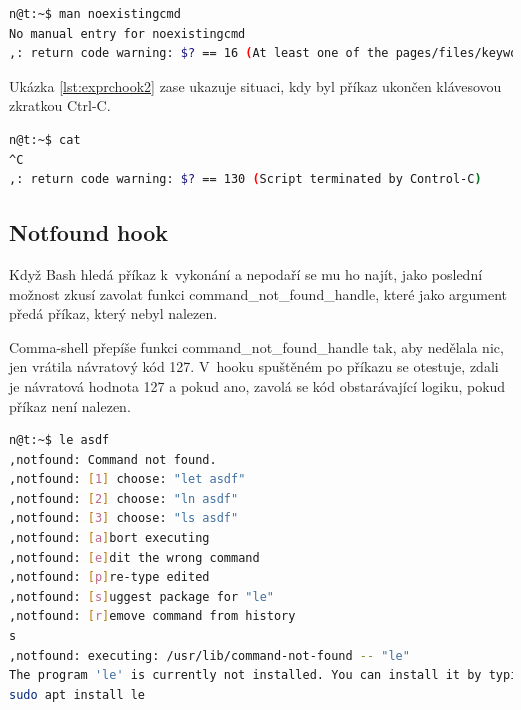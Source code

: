 \documentclass[thesis=M,czech]{FITthesis}[2012/06/26]
\begin{document}
\noindent
\begin{minipage}{\linewidth}
\begin{lstlisting}[language=bash, caption={Explain RC hook}, label={lst:exprchook}]
n@t:~$ man noexistingcmd
No manual entry for noexistingcmd
,: return code warning: $? == 16 (At least one of the pages/files/keywords didn't exist or wasn't matched.)
\end{lstlisting}
\end{minipage}

Ukázka \ref{lst:exprchook2} zase ukazuje situaci, kdy byl příkaz ukončen klávesovou zkratkou Ctrl-C.

\noindent
\begin{minipage}{\linewidth}
\begin{lstlisting}[language=bash, caption={Explain RC hook}, label={lst:exprchook2}]
n@t:~$ cat
^C
,: return code warning: $? == 130 (Script terminated by Control-C)
\end{lstlisting}
\end{minipage}


\subsection{Notfound hook}

Když Bash hledá příkaz k~vykonání a nepodaří se mu ho najít, jako poslední možnost zkusí zavolat funkci command\_not\_found\_handle, které jako argument předá příkaz, který nebyl nalezen.

Comma-shell přepíše funkci command\_not\_found\_handle tak, aby nedělala nic, jen vrátila návratový kód 127. V~hooku spuštěném po příkazu se otestuje, zdali je návratová hodnota 127 a pokud ano, zavolá se kód obstarávající logiku, pokud příkaz není nalezen.

\noindent
\begin{minipage}{\linewidth}
\begin{lstlisting}[language=bash, caption={Explain RC hook}, label={lst:notfoundhook}]
n@t:~$ le asdf
,notfound: Command not found.
,notfound: [1] choose: "let asdf"
,notfound: [2] choose: "ln asdf"
,notfound: [3] choose: "ls asdf"
,notfound: [a]bort executing
,notfound: [e]dit the wrong command
,notfound: [p]re-type edited
,notfound: [s]uggest package for "le"
,notfound: [r]emove command from history
s
,notfound: executing: /usr/lib/command-not-found -- "le"
The program 'le' is currently not installed. You can install it by typing:
sudo apt install le
\end{lstlisting}
\end{minipage}
\end{document}
